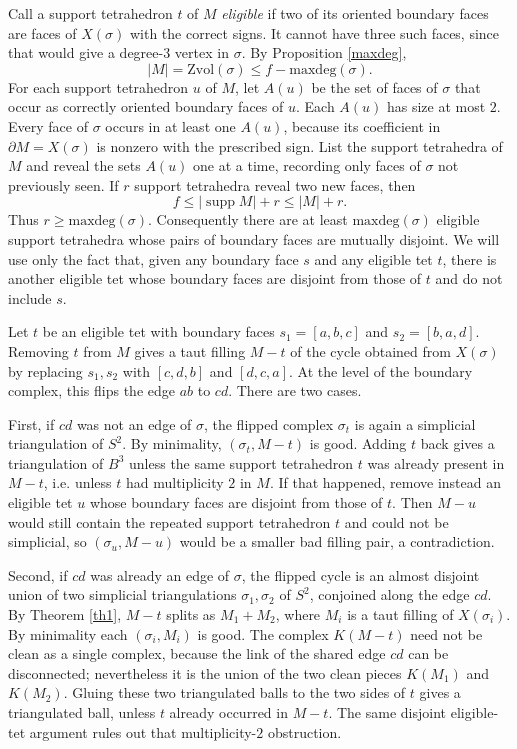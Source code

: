 \documentclass[12pt]{article}
\newcommand{\kw}{\mathrm}
\newcommand{\maxdeg}{\kw{maxdeg}}
\newcommand{\Zvol}{\kw{Zvol}}
\begin{document}
Call a support tetrahedron $t$ of $M$ \emph{eligible} if two of its
oriented boundary faces are faces of $X(\sigma)$ with the correct signs.
It cannot have three such faces, since that would give a degree-$3$
vertex in $\sigma$.
By Proposition \ref{maxdeg},
\[
|M|=\Zvol(\sigma) \leq f-\maxdeg(\sigma).
\]
For each support tetrahedron $u$ of $M$, let $A(u)$ be the set of faces
of $\sigma$ that occur as correctly oriented boundary faces of $u$.
Each $A(u)$ has size at most $2$.
Every face of $\sigma$ occurs in at least one $A(u)$, because its
coefficient in $\partial M=X(\sigma)$ is nonzero with the prescribed sign.
List the support tetrahedra of $M$ and reveal the sets $A(u)$ one at a
time, recording only faces of $\sigma$ not previously seen.
If $r$ support tetrahedra reveal two new faces, then
\[
f \leq |\operatorname{supp} M|+r \leq |M|+r.
\]
Thus $r\geq \maxdeg(\sigma)$.
Consequently there are at least $\maxdeg(\sigma)$ eligible support
tetrahedra whose pairs of boundary faces are mutually disjoint.
We will use only the fact that, given any boundary face $s$ and any
eligible tet $t$, there is another eligible tet whose boundary faces are
disjoint from those of $t$ and do not include $s$.

Let $t$ be an eligible tet with boundary faces
$s_1=[a,b,c]$ and $s_2=[b,a,d]$.
Removing $t$ from $M$ gives a taut filling $M-t$ of the cycle obtained
from $X(\sigma)$ by replacing $s_1,s_2$ with
$[c,d,b]$ and $[d,c,a]$.
At the level of the boundary complex, this flips the edge $ab$ to $cd$.
There are two cases.

First, if $cd$ was not an edge of $\sigma$, the flipped complex
$\sigma_t$ is again a simplicial triangulation of $S^2$.
By minimality, $(\sigma_t,M-t)$ is good.
Adding $t$ back gives a triangulation of $B^3$ unless the same support
tetrahedron $t$ was already present in $M-t$, i.e. unless $t$ had
multiplicity $2$ in $M$.
If that happened, remove instead an eligible tet $u$ whose boundary faces
are disjoint from those of $t$.
Then $M-u$ would still contain the repeated support tetrahedron $t$ and
could not be simplicial, so $(\sigma_u,M-u)$ would be a smaller bad
filling pair, a contradiction.

Second, if $cd$ was already an edge of $\sigma$, the flipped cycle is an
almost disjoint union of two simplicial triangulations
$\sigma_1,\sigma_2$ of $S^2$, conjoined along the edge $cd$.
By Theorem \ref{th1}, $M-t$ splits as $M_1+M_2$, where $M_i$ is a taut
filling of $X(\sigma_i)$.
By minimality each $(\sigma_i,M_i)$ is good.
The complex $K(M-t)$ need not be clean as a single complex, because the
link of the shared edge $cd$ can be disconnected; nevertheless it is the
union of the two clean pieces $K(M_1)$ and $K(M_2)$.
Gluing these two triangulated balls to the two sides of $t$ gives a
triangulated ball, unless $t$ already occurred in $M-t$.
The same disjoint eligible-tet argument rules out that multiplicity-$2$
obstruction.
\end{document}
